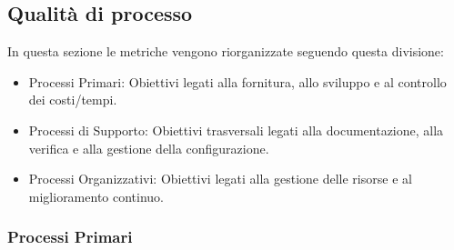 \documentclass[a4paper,12pt]{article}
\begin{document}
        \subsection{Qualità di processo}
            In questa sezione le metriche vengono riorganizzate seguendo questa divisione: 
            \begin{itemize}
                \item Processi Primari: Obiettivi legati alla fornitura, allo sviluppo e al controllo dei costi/tempi.
                \item Processi di Supporto: Obiettivi trasversali legati alla documentazione, alla verifica e alla gestione della configurazione.
                \item Processi Organizzativi: Obiettivi legati alla gestione delle risorse e al miglioramento continuo.
            \end{itemize}
            
            \subsubsection{Processi Primari}
\end{document}
